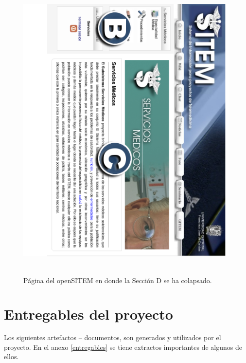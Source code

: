 \begin{figure}
 \centering
 \includegraphics[width=156mm, height=156mm]{seccion_colapsada.png}
 \caption{Página del openSITEM en donde la Sección D se ha colapsado.}
 \label{seccion_colapsada}
\end{figure}

\section{Entregables del proyecto}

Los siguientes artefactos – documentos, son generados y utilizados por el proyecto. En el anexo \ref{entregables} se tiene extractos importantes de algunos de ellos.

